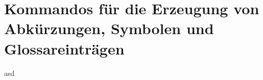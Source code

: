 %
%
%
\section{Kommandos f\"ur die Erzeugung von Abk\"urzungen, Symbolen und Glos\-sar\-eint\-r\"a\-gen}

asd